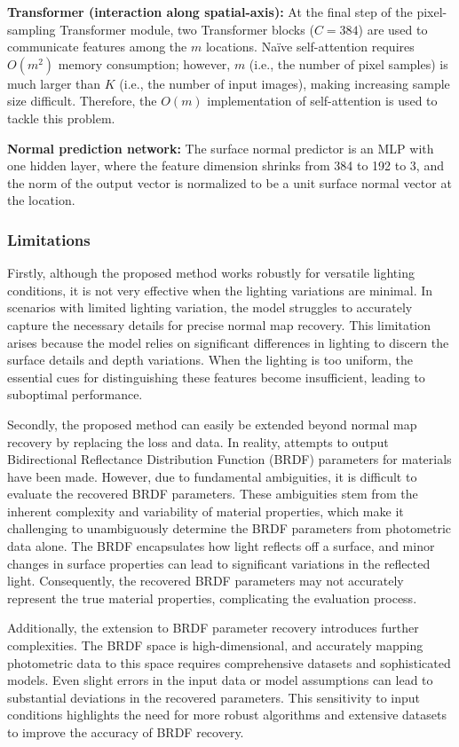 \textbf{Transformer (interaction along spatial-axis):} At the final step of the pixel-sampling Transformer module, two Transformer blocks ($C=384$) are used to communicate features among the $m$ locations. Naïve self-attention requires $O(m^2)$ memory consumption; however, $m$ (i.e., the number of pixel samples) is much larger than $K$ (i.e., the number of input images), making increasing sample size difficult. Therefore, the $O(m)$ implementation of self-attention is used to tackle this problem.

\textbf{Normal prediction network:} The surface normal predictor is an MLP with one hidden layer, where the feature dimension shrinks from 384 to 192 to 3, and the norm of the output vector is normalized to be a unit surface normal vector at the location.

\subsubsection{Limitations}
Firstly, although the proposed method works robustly for versatile lighting conditions, it is not very effective when the lighting variations are minimal. In scenarios with limited lighting variation, the model struggles to accurately capture the necessary details for precise normal map recovery. This limitation arises because the model relies on significant differences in lighting to discern the surface details and depth variations. When the lighting is too uniform, the essential cues for distinguishing these features become insufficient, leading to suboptimal performance.

Secondly, the proposed method can easily be extended beyond normal map recovery by replacing the loss and data. In reality, attempts to output Bidirectional Reflectance Distribution Function (BRDF) parameters for materials have been made. However, due to fundamental ambiguities, it is difficult to evaluate the recovered BRDF parameters. These ambiguities stem from the inherent complexity and variability of material properties, which make it challenging to unambiguously determine the BRDF parameters from photometric data alone. The BRDF encapsulates how light reflects off a surface, and minor changes in surface properties can lead to significant variations in the reflected light. Consequently, the recovered BRDF parameters may not accurately represent the true material properties, complicating the evaluation process.

Additionally, the extension to BRDF parameter recovery introduces further complexities. The BRDF space is high-dimensional, and accurately mapping photometric data to this space requires comprehensive datasets and sophisticated models. Even slight errors in the input data or model assumptions can lead to substantial deviations in the recovered parameters. This sensitivity to input conditions highlights the need for more robust algorithms and extensive datasets to improve the accuracy of BRDF recovery.

